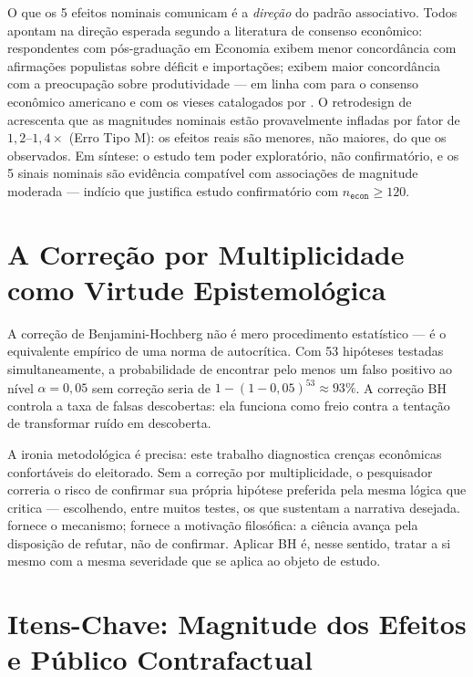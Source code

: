 O que os 5 efeitos nominais comunicam é a \textit{direção} do padrão associativo. Todos apontam na direção esperada segundo a literatura de consenso econômico: respondentes com pós-graduação em Economia exibem menor concordância com afirmações populistas sobre déficit e importações; exibem maior concordância com a preocupação sobre produtividade — em linha com  para o consenso econômico americano e com os vieses catalogados por . O retrodesign de  acrescenta que as magnitudes nominais estão provavelmente infladas por fator de $1{,}2$--$1{,}4\times$ (Erro Tipo M): os efeitos reais são menores, não maiores, do que os observados. Em síntese: o estudo tem poder exploratório, não confirmatório, e os 5 sinais nominais são evidência compatível com associações de magnitude moderada — indício que justifica estudo confirmatório com $n_{\texttt{econ}} \geq 120$.

\section{A Correção por Multiplicidade como Virtude Epistemológica}
\label{sec:bh-virtude}

A correção de Benjamini-Hochberg \cite{benjamini1995fdr} não é mero procedimento estatístico — é o equivalente empírico de uma norma de autocrítica. Com 53 hipóteses testadas simultaneamente, a probabilidade de encontrar pelo menos um falso positivo ao nível $\alpha = 0{,}05$ sem correção seria de $1 - (1-0{,}05)^{53} \approx 93\%$. A correção BH controla a taxa de falsas descobertas: ela funciona como freio contra a tentação de transformar ruído em descoberta.

A ironia metodológica é precisa: este trabalho diagnostica crenças econômicas confortáveis do eleitorado. Sem a correção por multiplicidade, o pesquisador correria o risco de confirmar sua própria hipótese preferida pela mesma lógica que critica — escolhendo, entre muitos testes, os que sustentam a narrativa desejada.  fornece o mecanismo;  fornece a motivação filosófica: a ciência avança pela disposição de refutar, não de confirmar. Aplicar BH é, nesse sentido, tratar a si mesmo com a mesma severidade que se aplica ao objeto de estudo.

\section{Itens-Chave: Magnitude dos Efeitos e Público Contrafactual}
\label{sec:itens-chave}

